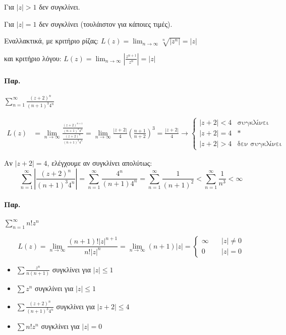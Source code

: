 \documentclass[12pt,a4paper,titlepage,fleqn]{article}
\begin{document}
     Για \( |z|>1 \) δεν συγκλίνει.
     
     Για \( |z|=1 \) δεν συγκλίνει (τουλάιστον για κάποιες τιμές).
     
     Εναλλακτικά, με κριτήριο ρίζας: \( L(z)=\lim_{n\to \infty}
     \sqrt[n]{\left|z^n\right|} = |z|
      \)
      
     και κριτήριο λόγου: \( L(z) = \lim_{n\to\infty}\left|
     \frac{z^{n+1}}{z^n}\right| =|z| \)
    
     
     \paragraph{Παρ.}
     \( \sum_{n=1}^\infty \frac{(z+2)^n}{(n+1)^3 4^n} \)
     
     \begin{align*}
     L(z) &= \lim_{n\to \infty}\frac{\frac{(z+2)^{n+1}}{(n+1)^3 4^n}}{
     	\frac{(z+2)^n}{(n+1)^3 4^n}
     	} = \lim_{n\to\infty} \frac{|z+2|}{4}\left(
     	\frac{n+1}{n+2}
     	\right)^3= \frac{|z+2|}{4} \to \begin{cases}
     	|z+2| < 4 & \text{συγκλίνει} \\
     	|z+2| = 4 & * \text{} \\
     	|z+2| > 4 & \text{δεν συγκλίνει}
     	\end{cases}
     \end{align*}
     
     Αν \( |z+2|= 4 \), ελέγχουμε αν συγκλίνει απολύτως: \[ 
     \sum_{n=1}^\infty \left| \frac{(z+2)^n}{(n+1)^3 4^n} \right|
     = \sum_{n=1}^\infty \frac{4^n}{(n+1) 4^n} = \sum_{n=1}^\infty
     \frac{1}{(n+1)^2} < \sum_{n=1}^\infty \frac{1}{n^3} < \infty
      \]
   
   \paragraph{Παρ.} \( \sum_{n=1}^\infty n!z^n \)
   
   \[
   L(z) = \lim_{n\to \infty} \frac{(n+1)!|z|^{n+1}}{n!|z|^n}
   = \lim_{n\to \infty}(n+1)|z|=\begin{cases}
   \infty \quad & |z| \neq 0 \\
   0 \quad & |z| = 0
   \end{cases}
   \]
   
  \begin{infobox}{}
     	\begin{itemize}
     		\item
     		\( \displaystyle \sum\frac{z^n}{n(n+1)} \) συγκλίνει για \( |z|\leq 1 \)
     		\item
     		\( \displaystyle \sum z^n \) συγκλίνει για \( |z|\leq 1 \)
     		\item
     		\( \displaystyle \sum \frac{(z+2)^n}{(n+1)^3 4^n} \)
     		συγκλίνει για \( |z+2| \leq 4 \)
     		\item
     		\( \displaystyle \sum n!z^n \) συγκλίνει για \( |z| = 0 \)
     	\end{itemize}
  \end{infobox}
  
\end{document}
